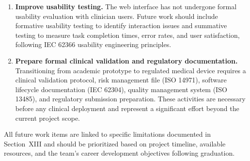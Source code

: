 \begin{enumerate}
    \item \textbf{Improve usability testing.} The web interface has not undergone formal usability evaluation with clinician users. Future work should include formative usability testing to identify interaction issues and summative testing to measure task completion times, error rates, and user satisfaction, following IEC 62366 usability engineering principles.
    
    \item \textbf{Prepare formal clinical validation and regulatory documentation.} Transitioning from academic prototype to regulated medical device requires a clinical validation protocol, risk management file (ISO 14971), software lifecycle documentation (IEC 62304), quality management system (ISO 13485), and regulatory submission preparation. These activities are necessary before any clinical deployment and represent a significant effort beyond the current project scope.
\end{enumerate}

All future work items are linked to specific limitations documented in Section~XIII and should be prioritized based on project timeline, available resources, and the team's career development objectives following graduation.
